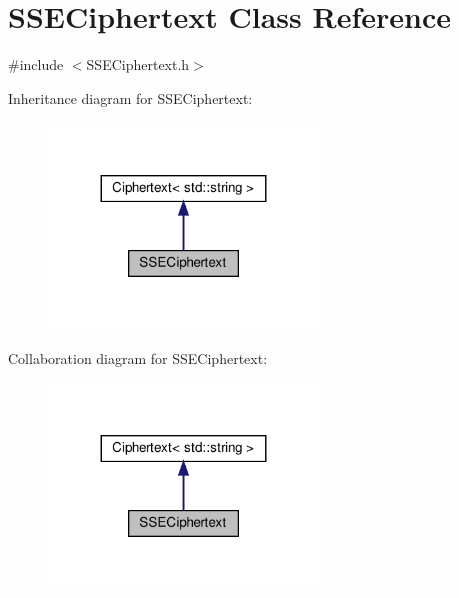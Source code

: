 \hypertarget{classSSECiphertext}{}\section{S\+S\+E\+Ciphertext Class Reference}
\label{classSSECiphertext}


{\ttfamily \#include $<$S\+S\+E\+Ciphertext.\+h$>$}



Inheritance diagram for S\+S\+E\+Ciphertext\+:
\nopagebreak
\begin{figure}[H]
\begin{center}
\leavevmode
\includegraphics[width=203pt]{classSSECiphertext__inherit__graph}
\end{center}
\end{figure}


Collaboration diagram for S\+S\+E\+Ciphertext\+:
\nopagebreak
\begin{figure}[H]
\begin{center}
\leavevmode
\includegraphics[width=203pt]{classSSECiphertext__coll__graph}
\end{center}
\end{figure}
